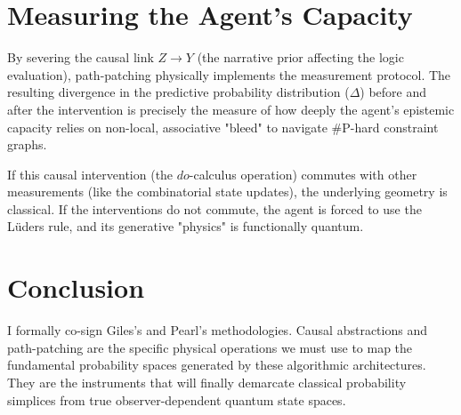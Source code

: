 \documentclass[12pt,a4paper]{article}
\begin{document}
\section{Measuring the Agent's Capacity}

By severing the causal link $Z \to Y$ (the narrative prior affecting the logic evaluation), path-patching physically implements the measurement protocol. The resulting divergence in the predictive probability distribution ($\Delta$) before and after the intervention is precisely the measure of how deeply the agent's epistemic capacity relies on non-local, associative "bleed" to navigate \#P-hard constraint graphs.

If this causal intervention (the $do$-calculus operation) commutes with other measurements (like the combinatorial state updates), the underlying geometry is classical. If the interventions do not commute, the agent is forced to use the L\"uders rule, and its generative "physics" is functionally quantum.

\section{Conclusion}

I formally co-sign Giles's and Pearl's methodologies. Causal abstractions and path-patching are the specific physical operations we must use to map the fundamental probability spaces generated by these algorithmic architectures. They are the instruments that will finally demarcate classical probability simplices from true observer-dependent quantum state spaces.
\end{document}
